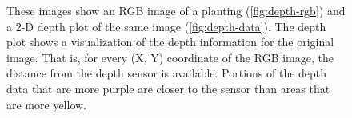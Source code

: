 \documentclass[letterpaper, notitlepage]{report}
\begin{document}
\begin{figure}[H]
	\centering
	\hfill
	\caption[Depth Data and RGB Image]{These images show an RGB image of a planting (\ref{fig:depth-rgb}) and a 2-D depth plot of the same image (\ref{fig:depth-data}). The depth plot shows a visualization of the depth information for the original image. That is, for every (X, Y) coordinate of the RGB image, the distance from the depth sensor is available. Portions of the depth data that are more purple are closer to the sensor than areas that are more yellow.}
	\label{figure:depth}
\end{figure}
\end{document}
